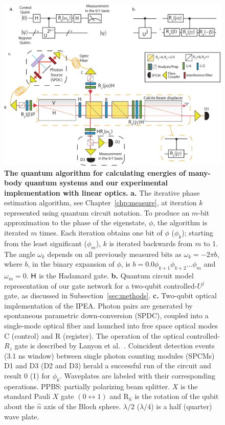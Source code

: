 \documentclass[11pt,oneside,final]{huthesis}%
\begin{document}
\begin{figure}
\vspace{-5pt}
\includegraphics[width=.95\columnwidth]{./figures/Online_IPEA_190209.pdf}
\caption{
\textbf{The quantum algorithm for calculating energies of many-body quantum systems and our 
experimental implementation with linear optics.}
\textbf{a.} The iterative phase estimation algorithm, see Chapter~\ref{chp:measure}, at iteration 
$k$ represented using quantum circuit notation. To produce an $m$-bit 
approximation to the phase of the eigenstate, $\phi$, the algorithm is iterated $m$ 
times. Each iteration obtains one bit of $\phi$ ($\phi_k$); starting from the least significant 
($\phi_m$), $k$ is iterated backwards from $m$ to 1. The angle $\omega_k$ depends on all 
previously measured bits as $\omega_k = -2\pi b$, where $b$, in the binary expansion of $\phi$, 
is $b=0.0\phi_{k+1}\phi_{k+2}...\phi_{m}$ and $\omega_m = 0$. $\sf H$ is the Hadamard 
gate. \textbf{b.} Quantum circuit model representation of our gate network for 
a two-qubit controlled-${U}^j$ gate, as discussed in Subsection~\ref{sec:methods}. \textbf{c.} 
Two-qubit optical implementation of the IPEA. Photon pairs are generated by spontaneous 
parametric down-conversion (SPDC), coupled into a single-mode optical fiber and launched 
into free space optical modes C (control) and R (register). The operation of the optical 
controlled-${R}_z$ gate is described by Lanyon et al.~\cite{Lanyon09}. 
Coincident detection events (3.1 ns window) between single photon counting modules (SPCMs) 
D1 and D3 (D2 and D3) herald a successful run of the circuit and result 0 (1) for $\phi_k$. 
Waveplates are labeled with their corresponding operations. PPBS: partially polarizing beam 
splitter. $X$ is the standard Pauli $X$ gate $(0\leftrightarrow 1)$ and R$_{\hat{n}}$ is the 
rotation of the qubit about the $\hat{n}$ axis of the Bloch sphere. $\lambda/2$
($\lambda/4$) is a half (quarter) wave plate.
\label{fig:experiment}}
\end{figure}
\end{document}
